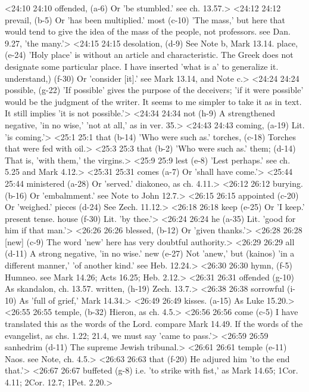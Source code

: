 <24:10 24:10  offended, (a-6)  Or 'be stumbled.' see ch. 13.57.>
<24:12 24:12  prevail, (b-5)  Or 'has been multiplied.'
  most (c-10)  'The mass,' but here that would tend to give the idea of the  mass of the people, not professors. see Dan. 9.27, 'the many.'>
<24:15 24:15  desolation, (d-9)  See Note b, Mark 13.14.
  place, (e-24)  'Holy place' is without an article and characteristic. The  Greek does not designate some particular place. I have  inserted 'what is a' to generalize it.
  understand,) (f-30)  Or 'consider [it].' see Mark 13.14, and Note c.>
<24:24 24:24  possible, (g-22)  'If possible' gives the purpose of the deceivers; 'if it were  possible' would be the judgment of the writer. It seems to me  simpler to take it as in text. It still implies 'it is not  possible.'>
<24:34 24:34  not (h-9)  A strengthened negative, 'in no wise,' 'not at all,' as in  ver. 35.>
<24:43 24:43  coming, (a-19)  Lit. 'is coming.'>
<25:1 25:1  that (b-14)  'Who were such as.'
  torches, (c-18)  Torches that were fed with oil.>
<25:3 25:3  that (b-2)  'Who were such as.'
  them; (d-14)  That is, 'with them,' the virgins.>
<25:9 25:9  lest (e-8)  'Lest perhaps.' see ch. 5.25 and Mark 4.12.>
<25:31 25:31  comes (a-7)  Or 'shall have come.'>
<25:44 25:44  ministered (a-28)  Or 'served.' diakoneo, as ch. 4.11.>
<26:12 26:12  burying. (b-16)  Or 'embalmment.' see Note to John 12.7.>
<26:15 26:15  appointed (c-20)  Or 'weighed.'
  pieces (d-24)  See Zech. 11.12.>
<26:18 26:18  keep (e-25)  Or 'I keep.' present tense.
  house (f-30)  Lit. 'by thee.'>
<26:24 26:24  he (a-35)  Lit. 'good for him if that man.'>
<26:26 26:26  blessed, (b-12)  Or 'given thanks.'>
<26:28 26:28  [new] (c-9)  The word 'new' here has very doubtful authority.>
<26:29 26:29  all (d-11)  A strong negative, 'in no wise.'
  new (e-27)  Not 'anew,' but (kainos) 'in a different manner,' 'of  another kind.' see Heb. 12.24.>
<26:30 26:30  hymn, (f-5)  Humneo. see Mark 14.26; Acts 16.25; Heb. 2.12.>
<26:31 26:31  offended (g-10)  As skandalon, ch. 13.57.
  written, (h-19)  Zech. 13.7.>
<26:38 26:38  sorrowful (i-10)  As 'full of grief,' Mark 14.34.>
<26:49 26:49  kisses. (a-15)  As Luke 15.20.>
<26:55 26:55  temple, (b-32)  Hieron, as ch. 4.5.>
<26:56 26:56  come (c-5)  I have translated this as the words of the Lord. compare Mark  14.49. If the words of the evangelist, as chs. 1.22; 21.4, we  must say 'came to pass.'>
<26:59 26:59  sanhedrim (d-11)  The supreme Jewish tribunal.>
<26:61 26:61  temple (e-11)  Naos. see Note, ch. 4.5.>
<26:63 26:63  that (f-20)  He adjured him 'to the end that.'>
<26:67 26:67  buffeted (g-8)  i.e. 'to strike with fist,' as Mark 14.65; 1Cor. 4.11; 2Cor.  12.7; 1Pet. 2.20.>
